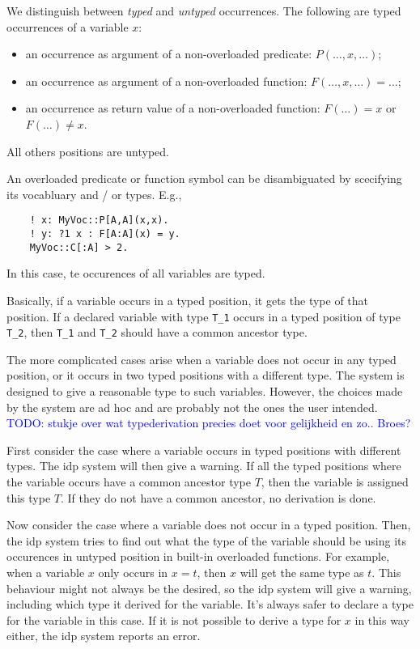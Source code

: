 \documentclass[a4]{article}
\newcommand{\idp}{{\sc idp}\xspace}
\newcommand{\gidl}{{\sc GidL}\xspace}
\newcommand{\todo}[1]{\textcolor{blue}{TODO: #1}}
\begin{document}
We distinguish between \emph{typed} and \emph{untyped} occurrences. The following are typed occurrences of a variable $x$:
\begin{itemize}
	\item an occurrence as argument of a non-overloaded predicate: $P(\ldots,x,\ldots)$;
	\item an occurrence as argument of a non-overloaded function: $F(\ldots,x,\ldots) = \ldots$;
	\item an occurrence as return value of a non-overloaded function: $F(\ldots) = x$ or $F(\ldots) \neq x$. 
\end{itemize}

All others positions are untyped. 

An overloaded predicate or function symbol can be disambiguated by scecifying its vocabluary and / or types.  E.g.,
\begin{lstlisting}
	! x: MyVoc::P[A,A](x,x).
	! y: ?1 x : F[A:A](x) = y.
	MyVoc::C[:A] > 2.
\end{lstlisting}
In this case, te occurences of all variables are typed.


Basically, if a variable occurs in a typed position, it gets the type of that position.  
If a declared variable with type {\tt T\_1} occurs in a typed position of type {\tt T\_2}, then {\tt T\_1} and {\tt T\_2} should have a common ancestor type.


The more complicated cases arise when a variable does not occur in any typed position, or it occurs in two typed positions with a different type. The system is designed to give a reasonable type to such variables. However, the choices made by the system are ad hoc and are probably not the ones the user intended. %
\todo{stukje over wat typederivation precies doet voor gelijkheid en zo.. Broes?}

First consider the case where a variable occurs in typed positions with different types. The \idp system will then give a warning. If all the typed positions where the variable occurs have a common ancestor type $T$, then the variable is assigned this type $T$. If they do not have a common ancestor, no derivation is done.

Now consider the case where a variable does not occur in a typed position. Then, the \idp system tries to find out what the type of the variable should be using its occurences in untyped position in built-in overloaded functions.  For example, when a variable $x$ only occurs in $x=t$, then $x$ will get the same type as $t$.  This behaviour might not always be the desired, so the \idp system will give a warning, including which type it derived for the variable.  It's always safer to declare a type for the variable in this case.  If it is not possible to derive a type for $x$ in this way either, the \idp system reports an error.
\end{document}
